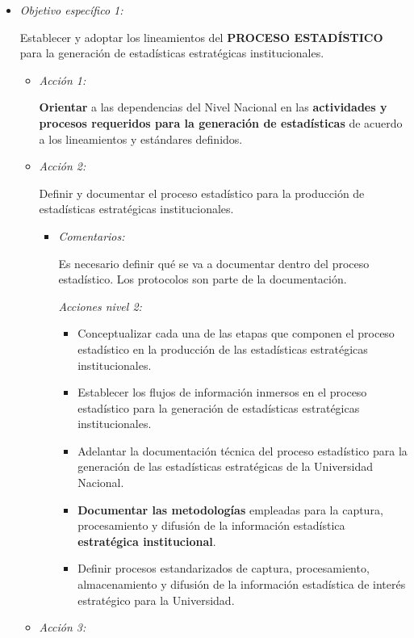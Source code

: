 \documentclass[
]{book}
\providecommand{\tightlist}{%
  \setlength{\itemsep}{0pt}\setlength{\parskip}{0pt}}
\begin{document}
\begin{itemize}
\item
  \emph{Objetivo específico 1:}

  Establecer y adoptar los lineamientos del \textbf{PROCESO ESTADÍSTICO} para la generación de estadísticas estratégicas institucionales.

  \begin{itemize}
  \item
    \emph{Acción 1:}

    \textbf{Orientar} a las dependencias del Nivel Nacional en las \textbf{actividades y procesos requeridos para la generación de estadísticas} de acuerdo a los lineamientos y estándares definidos.
  \item
    \emph{Acción 2:}

    Definir y documentar el proceso estadístico para la producción de estadísticas estratégicas institucionales.

    \begin{itemize}
    \item
      \emph{Comentarios:}

      Es necesario definir qué se va a documentar dentro del proceso estadístico. Los protocolos son parte de la documentación.

      \emph{Acciones nivel 2:}

      \begin{itemize}
      \tightlist
      \item
        Conceptualizar cada una de las etapas que componen el proceso estadístico en la producción de las estadísticas estratégicas institucionales.
      \item
        Establecer los flujos de información inmersos en el proceso estadístico para la generación de estadísticas estratégicas institucionales.
      \item
        Adelantar la documentación técnica del proceso estadístico para la generación de las estadísticas estratégicas de la Universidad Nacional.
      \item
        \textbf{Documentar las metodologías} empleadas para la captura, procesamiento y difusión de la información estadística \textbf{estratégica institucional}.
      \item
        Definir procesos estandarizados de captura, procesamiento, almacenamiento y difusión de la información estadística de interés estratégico para la Universidad.
      \end{itemize}
    \end{itemize}
  \item
    \emph{Acción 3:}


\end{itemize}
\end{itemize}
\end{document}
